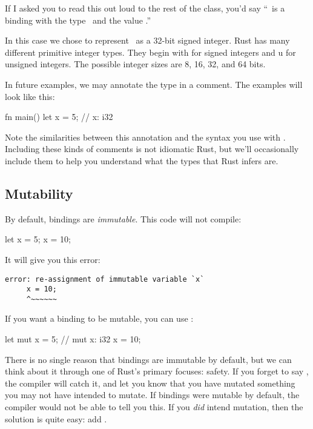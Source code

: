 If I asked you to read this out loud to the rest of the class, you'd say “\x\ is a binding with the type \itt\ and the
value .”

\blank

In this case we chose to represent \x\ as a 32-bit signed integer. Rust has many different primitive integer types. They 
begin with  for signed integers and u for unsigned integers. The possible integer sizes are 8, 16, 32, and 64 bits.

\blank

In future examples, we may annotate the type in a comment. The examples will look like this:

\begin{rustc}
fn main() {
    let x = 5; // x: i32
}
\end{rustc}

Note the similarities between this annotation and the syntax you use with \keylet. Including these kinds of comments is not
idiomatic Rust, but we'll occasionally include them to help you understand what the types that Rust infers are.

\subsection*{Mutability}

By default, bindings are \emph{immutable}. This code will not compile:

\begin{rustc}
let x = 5;
x = 10;
\end{rustc}

It will give you this error:

\begin{verbatim}
error: re-assignment of immutable variable `x`
     x = 10;
     ^~~~~~~
\end{verbatim}

If you want a binding to be mutable, you can use \mut:

\begin{rustc}
let mut x = 5; // mut x: i32
x = 10;
\end{rustc}

There is no single reason that bindings are immutable by default, but we can think about it through one of Rust's primary focuses:
safety. If you forget to say \mut, the compiler will catch it, and let you know that you have mutated something you may not
have intended to mutate. If bindings were mutable by default, the compiler would not be able to tell you this. If you \emph{did}
intend mutation, then the solution is quite easy: add \mut.

